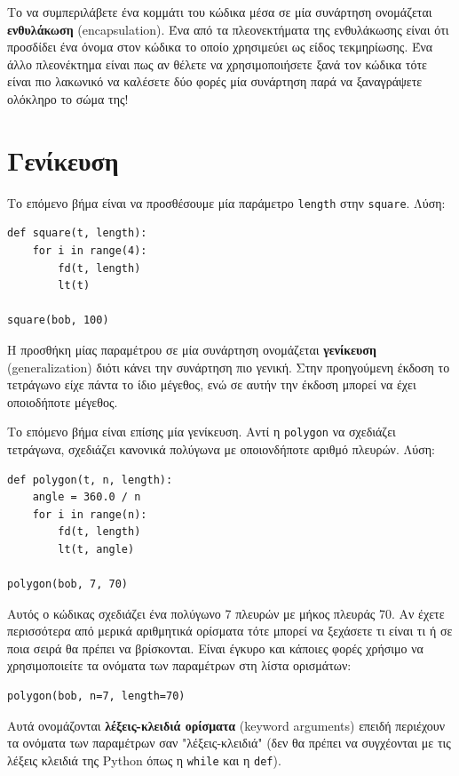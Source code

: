 \documentclass[10pt]{book}
\begin{document}
Το να συμπεριλάβετε ένα κομμάτι του κώδικα μέσα σε μία συνάρτηση ονομάζεται {\bf ενθυλάκωση} (encapsulation). Ένα από τα πλεονεκτήματα της ενθυλάκωσης είναι ότι προσδίδει ένα όνομα στον κώδικα το οποίο χρησιμεύει ως είδος τεκμηρίωσης. Ένα άλλο πλεονέκτημα είναι πως αν θέλετε να χρησιμοποιήσετε ξανά τον κώδικα τότε είναι πιο λακωνικό να καλέσετε δύο φορές μία συνάρτηση παρά να ξαναγράψετε ολόκληρο το σώμα της!


\section{Γενίκευση}

Το επόμενο βήμα είναι να προσθέσουμε μία παράμετρο  {\tt length}  στην  {\tt square}. Λύση:


\begin{verbatim}
def square(t, length):
    for i in range(4):
        fd(t, length)
        lt(t)

square(bob, 100)
\end{verbatim}
%

Η προσθήκη μίας παραμέτρου σε μία συνάρτηση ονομάζεται {\bf γενίκευση} (generalization) διότι κάνει την συνάρτηση πιο γενική. Στην προηγούμενη έκδοση το τετράγωνο είχε πάντα το ίδιο μέγεθος, ενώ σε αυτήν την έκδοση μπορεί να έχει οποιοδήποτε μέγεθος.

Το επόμενο βήμα είναι επίσης μία γενίκευση. Αντί η {\tt polygon} να σχεδιάζει τετράγωνα, σχεδιάζει κανονικά πολύγωνα με οποιονδήποτε αριθμό πλευρών. Λύση:


\begin{verbatim}
def polygon(t, n, length):
    angle = 360.0 / n
    for i in range(n):
        fd(t, length)
        lt(t, angle)

polygon(bob, 7, 70)
\end{verbatim}
%

Αυτός ο κώδικας σχεδιάζει ένα πολύγωνο 7 πλευρών με μήκος πλευράς 70. Αν έχετε περισσότερα από μερικά αριθμητικά ορίσματα τότε μπορεί να ξεχάσετε τι είναι τι ή σε ποια σειρά θα πρέπει να βρίσκονται. Είναι έγκυρο και κάποιες φορές χρήσιμο να χρησιμοποιείτε τα ονόματα των παραμέτρων στη λίστα ορισμάτων:

\begin{verbatim}
polygon(bob, n=7, length=70)
\end{verbatim}
%

Αυτά ονομάζονται {\bf λέξεις-κλειδιά ορίσματα} (keyword arguments) επειδή περιέχουν τα ονόματα των παραμέτρων σαν "λέξεις-κλειδιά" (δεν θα πρέπει να συγχέονται με τις λέξεις κλειδιά της Python όπως η {\tt while} και η {\tt def}).
\end{document}
